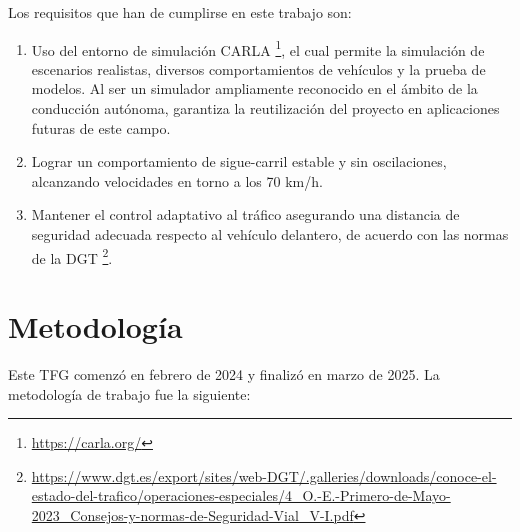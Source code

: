 Los requisitos que han de cumplirse en este trabajo son:
\begin{enumerate}
\item Uso del entorno de simulación CARLA \footnote{\url{https://carla.org/}}, el cual permite la simulación de escenarios realistas, diversos comportamientos de vehículos y la prueba de modelos. Al ser un simulador ampliamente reconocido en el ámbito de la conducción autónoma, garantiza la reutilización del proyecto en aplicaciones futuras de este campo.
\item Lograr un comportamiento de sigue-carril estable y sin oscilaciones, alcanzando velocidades en torno a los 70 km/h.
\item Mantener el control adaptativo al tráfico asegurando una distancia de seguridad adecuada respecto al vehículo delantero, de acuerdo con las normas de la \ac{DGT} \footnote{\url{https://www.dgt.es/export/sites/web-DGT/.galleries/downloads/conoce-el-estado-del-trafico/operaciones-especiales/4_O.-E.-Primero-de-Mayo-2023_Consejos-y-normas-de-Seguridad-Vial_V-I.pdf}}.
\end{enumerate}

\section{Metodología}
\label{sec:metodologia}

Este TFG comenzó en febrero de 2024 y finalizó en marzo de 2025. La metodología de trabajo fue la siguiente:

